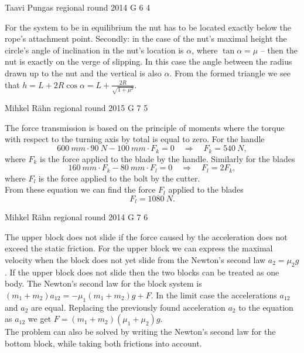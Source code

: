 \documentclass[11pt]{article}
\begin{document}
{Taavi Pungas} %
{regional round} %
{2014} %
{G 6} %
{4} %
{

\ifEngSolution
For the system to be in equilibrium the nut has to be located exactly below the rope’s attachment point. Secondly: in the case of the nut’s maximal height the circle’s angle of inclination in the nut’s location is $\alpha$, where $\tan \alpha = \mu$ – then the nut is exactly on the verge of slipping. In this case the angle between the radius drawn up to the nut and the vertical is also $\alpha$. From the formed triangle we see that $h=L+2R\cos \alpha = L+ \frac{2R}{\sqrt{1+\mu^2}}$.
\fi
}

{Mihkel Rähn} %
{regional round} %
{2015} %
{G 7} %
{5} %
{

\ifEngSolution
The force transmission is based on the principle of moments where the torque with respect to the turning axis by total is equal to zero. For the handle
\[ \SI{600}{mm}\cdot\SI{90}{N}-\SI{100}{mm}\cdot F_k = 0 \quad\Rightarrow\quad F_k = \SI{540}{N}, \]
where $F_k$ is the force applied to the blade by the handle. Similarly for the blades
\[ \SI{160}{mm}\cdot F_k - \SI{80}{mm}\cdot F_l = 0 \quad\Rightarrow\quad F_l = 2F_k, \]
where $F_l$ is the force applied to the bolt by the cutter.\\
From these equation we can find the force $F_l$ applied to the blades
\[ F_l = \SI{1080}{N}.\]
\fi
}

{Mihkel Rähn} %
{regional round} %
{2014} %
{G 7} %
{6} %
{

\ifEngSolution
The upper block does not slide if the force caused by the acceleration does not exceed the static friction. For the upper block we can express the maximal velocity when the block does not yet slide from the Newton’s second law $a_2=\mu_2g$. If the upper block does not slide then the two blocks can be treated as one body. The Newton’s second law for the block system is $(m_1+m_2)a_{12} = -\mu_1 (m_1+m_2)g+F$. In the limit case the accelerations $a_{12}$ and $a_2$ are equal. Replacing the previously found acceleration $a_2$ to the equation as $a_{12}$ we get $F=(m_1+m_2)(\mu_1+\mu_2)g$.\\
The problem can also be solved by writing the Newton’s second law for the bottom block, while taking both frictions into account.
\fi
}
\end{document}
